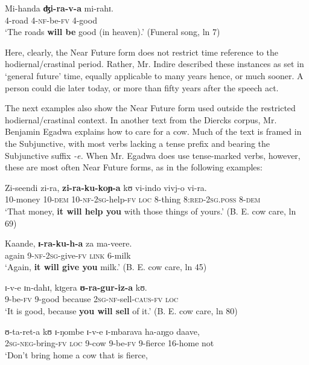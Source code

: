 \documentclass[output=paper]{langsci/langscibook}
\begin{document}
\ea\label{ex:sarvasy:3}
\gll Mi-handa   \textbf{ʤi-ra-v-a}   mi-rahɪ. \\
4-road 4-\textsc{nf}{}-be-\textsc{fv} 4-good \\
\glt ‘The roads \textbf{will be} good (in heaven).’ (Funeral song, ln 7)
\z

Here, clearly, the Near Future form does not restrict time reference to the hodiernal/crastinal period. Rather, Mr. Indire described these instances as set in ‘general future’ time, equally applicable to many years hence, or much sooner. A person could die later today, or more than fifty years after the speech act.

The next examples also show the Near Future form used outside the restricted hodiernal/crastinal context. In another text from the Diercks corpus, Mr. Benjamin Egadwa explains how to care for a cow. Much of the text is framed in the Subjunctive, with most verbs lacking a tense prefix and bearing the Subjunctive suffix \textit{{}-e. }When Mr. Egadwa does use tense-marked verbs, however, these are most often Near Future forms, as in the following examples: 

\ea\label{ex:sarvasy:4}
\gll Zi-seendi   zi-ra,     \textbf{zi-ra-ku-koɲ-a}   kʊ   vi-indo   vivj-o       vi-ra. \\
10-money  10-\textsc{dem}  10-\textsc{nf-2sg}{}-help-\textsc{fv}  \textsc{loc}  8-thing  8:\textsc{red-2sg.poss}  8-\textsc{dem} \\
\glt ‘That money, \textbf{it will help you} with those things of yours.’ (B. E. cow care, ln 69)
\z

\ea\label{ex:sarvasy:5}
\gll Kaande,   \textbf{ɪ{}-ra-ku-h-a}     za   ma-veere. \\
again  9-\textsc{nf-2sg}{}-give-\textsc{fv} \textsc{link}  6-milk \\
\glt ‘Again, \textbf{it will give you} milk.’ (B. E. cow care, ln 45)
\z

\ea\label{ex:sarvasy:6}
\gll ɪ{}-v-e   ɪn-dahɪ,   kɪgera   \textbf{ʊ{}-ra-gur-iz-a}       kʊ. \\
9-be-\textsc{fv}  9-good  because  \textsc{2sg-nf}{}-sell-\textsc{caus-fv}  \textsc{loc} \\
\glt ‘It is good, because \textbf{you will sell} of it.’ (B. E. cow care, ln 80)
\z 

\ea\label{ex:sarvasy:7}
\gll ʊ{}-ta-ret-a     kʊ   ɪ{}-ŋombe   ɪ{}-v-e     ɪ{}-mbarava   ha-aŋgo   daave, \\ 
\textsc{2sg-neg}{}-bring-\textsc{fv}  \textsc{loc}  9-cow    9-be-\textsc{fv}  9-fierce  16-home  not \\ 
\glt ‘Don’t bring home a cow that is fierce, 
\end{document}
